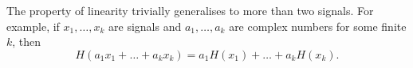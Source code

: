 The property of linearity trivially generalises to more than two signals.  For example, if $x_1,\dots,x_k$ are signals and $a_1,\dots,a_k$ are complex numbers for some finite $k$, then
\[
H( a_1x_1 + \dots + a_k x_k ) = a_1 H(x_1) + \dots + a_k H(x_k).
\]




